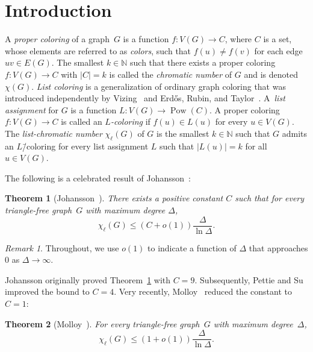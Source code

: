 \documentclass[11pt, reqno, psamsfonts]{amsart}
\newtheorem{theo}{Theorem}[section]
\theoremstyle{definition}
\theoremstyle{remark}
\newtheorem*{remk}{Remark}
\newcommand{\0}{\varnothing}
\newcommand{\N}{\mathbb{N}}
\renewcommand{\leq}{\leqslant}
\newcommand{\powerset}[1]{\operatorname{Pow}(#1)}
\numberwithin{equation}{section}
\begin{document}
	\section{Introduction}
	
	\noindent A \emph{proper coloring} of a graph~$G$ is a function $f \colon V(G) \to C$, where $C$ is a set, whose elements are referred to as \emph{colors}, such that $f(u) \neq f(v)$ for each edge $uv \in E(G)$. The smallest $k \in \N$ such that there exists a proper coloring $f \colon V(G) \to C$ with $|C| = k$ is called the \emph{chromatic number} of $G$ and is denoted~$\chi(G)$. \emph{List coloring} is a generalization of ordinary graph coloring that was introduced independently by Vizing~\cite{Vizing} and Erd\H{o}s, Rubin, and Taylor~\cite{ERT}. A~\emph{list assignment} for $G$ is a function $L \colon V(G) \to \powerset{C}$. %
	A proper coloring $f \colon V(G) \to C$ is called an \emph{$L$-coloring} if $f(u) \in L(u)$ for every $u \in V(G)$. The \emph{list-chromatic number} $\chi_\ell(G)$ of $G$  is the smallest $k \in \N$ such that $G$ admits an $L$\=/coloring for every list assignment $L$ such that $|L(u)| = k$ for all $u \in V(G)$.
	
	
	The following is a celebrated result of Johansson~\cite{Joh96}:
	
	\begin{theo}[{Johansson~\cite{Joh96}}]\label{theo:Joh}
		There exists a positive constant $C$ such that for every triangle-free graph~$G$ with maximum degree $\Delta$,
		\[
			\chi_\ell(G) \leq (C+o(1)) \frac{\Delta}{\ln \Delta}.
		\]
	\end{theo}
	
	\begin{remk}
		Throughout, we use $o(1)$ to indicate a function of $\Delta$ that approaches $0$ as $\Delta \to \infty$.
	\end{remk}
	
	
	Johansson originally proved Theorem~\ref{theo:Joh} with $C = 9$. Subsequently, Pettie and Su~\cite{PS15} improved the bound to $C = 4$. Very recently, Molloy~\cite{Mol17} reduced the constant to $C = 1$:
	
	\begin{theo}[{Molloy~\cite[Theorem~1]{Mol17}}]\label{theo:Mol}
		For every triangle-free graph~$G$ with maximum degree~$\Delta$,
		\[
		\chi_\ell(G) \leq (1+o(1)) \frac{\Delta}{\ln \Delta}.
		\]
	\end{theo}
	
\end{document}
